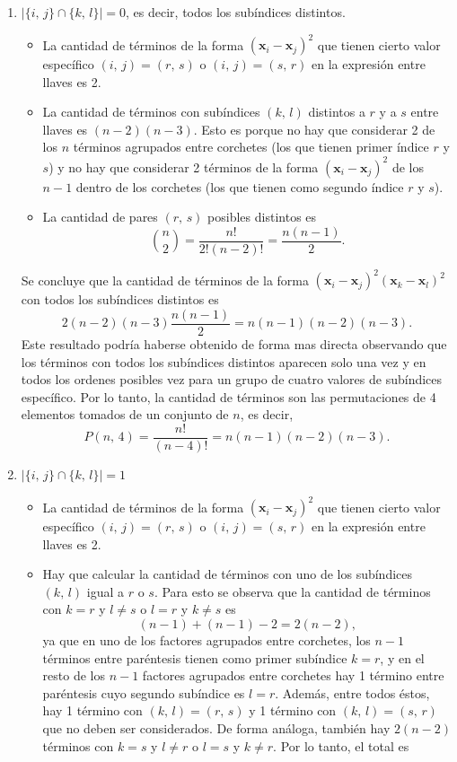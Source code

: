 \documentclass[a4paper]{report}
\newcommand{\x}{\mathbf{x}}
\begin{document}
\begin{enumerate}
 \item \(|\{i,\,j\}\cap\{k,\,l\}|=0\), es decir, todos los subíndices distintos.
 \begin{itemize}
  \item La cantidad de términos de la forma \((\x_i-\x_j)^2\) que tienen cierto valor específico \((i,\,j)=(r,\,s)\) o \((i,\,j)=(s,\,r)\) en la expresión entre llaves es 2.
  \item La cantidad de términos con subíndices \((k,\,l)\) distintos a \(r\) y a \(s\) entre llaves es \((n-2)(n-3)\). Esto es porque no hay que considerar 2 de los \(n\) términos agrupados entre corchetes (los que tienen primer índice \(r\) y \(s\)) y no hay que considerar 2 términos de la forma \((\x_i-\x_j)^2\) de los \(n-1\) dentro de los corchetes (los que tienen como segundo índice \(r\) y \(s\)).
  \item La cantidad de pares \((r,\,s)\) posibles distintos es
  \[
   \binom{n}{2}=\frac{n!}{2!(n-2)!}=\frac{n(n-1)}{2}.
  \]
 \end{itemize}
Se concluye que la cantidad de términos de la forma \((\x_i-\x_j)^2(\x_k-\x_l)^2\) con todos los subíndices distintos es
\[
 2(n-2)(n-3)\frac{n(n-1)}{2}=n(n-1)(n-2)(n-3).
\]
 Este resultado podría haberse obtenido de forma mas directa observando que los términos con todos los subíndices distintos aparecen solo una vez y en todos los ordenes posibles vez para un grupo de cuatro valores de subíndices específico. Por lo tanto, la cantidad de términos son las permutaciones de 4 elementos tomados de un conjunto de \(n\), es decir,
 \[
  P(n,\,4)=\frac{n!}{(n-4)!}=n(n-1)(n-2)(n-3).
 \]
\item \(|\{i,\,j\}\cap\{k,\,l\}|=1\)
 \begin{itemize}
  \item La cantidad de términos de la forma \((\x_i-\x_j)^2\) que tienen cierto valor específico \((i,\,j)=(r,\,s)\) o \((i,\,j)=(s,\,r)\) en la expresión entre llaves es 2.
  \item Hay que calcular la cantidad de términos con uno de los subíndices \((k,\,l)\) igual a \(r\) o \(s\). Para esto se observa que la cantidad de términos con \(k=r\) y \(l\neq s\) o \(l=r\) y \(k\neq s\) es
  \[
   (n-1)+(n-1)-2=2(n-2),
  \]
  ya que en uno de los factores agrupados entre corchetes, los \(n-1\) términos entre paréntesis tienen como primer subíndice \(k=r\), y en el resto de los \(n-1\) factores agrupados entre corchetes hay 1 término entre paréntesis cuyo segundo subíndice es \(l=r\). Además, entre todos éstos, hay 1 término con \((k,\,l)=(r,\,s)\) y 1 término con \((k,\,l)=(s,\,r)\) que no deben ser considerados. De forma análoga, también hay \(2(n-2)\) términos con \(k=s\) y \(l\neq r\) o \(l=s\) y \(k\neq r\). Por lo tanto, el total es

\end{itemize}
\end{enumerate}
\end{document}
